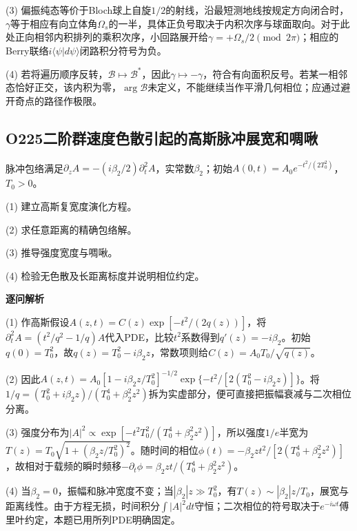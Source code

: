 (3) 偏振纯态等价于Bloch球上自旋$1/2$的射线，沿最短测地线按规定方向闭合时，$\gamma$等于相应有向立体角$\Omega_s$的一半，具体正负号取决于内积次序与球面取向。对于此处正向相邻内积排列的乘积次序，小回路展开给$\gamma=+\Omega_s/2\pmod{2\pi}$；相应的Berry联络$i\langle\psi|d\psi\rangle$闭路积分符号为负。

(4) 若将遍历顺序反转，$\mathcal B\mapsto\mathcal B^*$，因此$\gamma\mapsto-\gamma$，符合有向面积反号。若某一相邻态恰好正交，该内积为零，$\arg\mathcal B$未定义，不能继续当作平滑几何相位；应通过避开奇点的路径作极限。

\par\medskip

\subsection*{O225\quad 二阶群速度色散引起的高斯脉冲展宽和啁啾}

脉冲包络满足$\partial_zA=-(i\beta_2/2)\partial_t^2A$，实常数$\beta_2$；初始$A(0,t)=A_0e^{-t^2/(2T_0^2)}$，$T_0>0$。

(1) 建立高斯复宽度演化方程。

(2) 求任意距离的精确包络解。

(3) 推导强度宽度与啁啾。

(4) 检验无色散及长距离标度并说明相位约定。

\par\textbf{逐问解析}

(1) 作高斯假设$A(z,t)=C(z)\exp[-t^2/(2q(z))]$，将$\partial_t^2A=(t^2/q^2-1/q)A$代入PDE，比较$t^2$系数得到$q'(z)=-i\beta_2$。初始$q(0)=T_0^2$，故$q(z)=T_0^2-i\beta_2z$，常数项则给$C(z)=A_0T_0/\sqrt{q(z)}$。

(2) 因此$A(z,t)=A_0[1-i\beta_2z/T_0^2]^{-1/2}\exp\{-t^2/[2(T_0^2-i\beta_2z)]\}$。将$1/q=(T_0^2+i\beta_2z)/(T_0^4+\beta_2^2z^2)$拆为实虚部分，便可直接把振幅衰减与二次相位分离。

(3) 强度分布为$|A|^2\propto\exp[-t^2T_0^2/(T_0^4+\beta_2^2z^2)]$，所以强度$1/e$半宽为$T(z)=T_0\sqrt{1+(\beta_2z/T_0^2)^2}$。随时间的相位$\phi(t)=-\beta_2zt^2/[2(T_0^4+\beta_2^2z^2)]$，故相对于载频的瞬时频移$-\partial_t\phi=\beta_2zt/(T_0^4+\beta_2^2z^2)$。

(4) 当$\beta_2=0$，振幅和脉冲宽度不变；当$|\beta_2|z\gg T_0^2$，有$T(z)\sim|\beta_2|z/T_0$，展宽与距离线性。由于方程无损，时间积分$\int|A|^2dt$守恒；二次相位的符号取决于$e^{-i\omega t}$傅里叶约定，本题已用所列PDE明确固定。

\par\medskip
